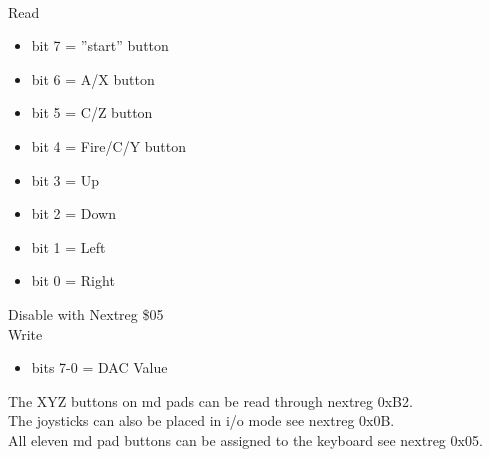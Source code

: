\\
Read
\begin{itemize}
\item[] bit 7 = ''start'' button
\item[] bit 6 = A/X button
\item[] bit 5 = C/Z button
\item[] bit 4 = Fire/C/Y button
\item[] bit 3 = Up
\item[] bit 2 = Down
\item[] bit 1 = Left
\item[] bit 0 = Right
\end{itemize}
Disable with Nextreg \$05\\
Write
\begin{itemize}
\item[] bits 7-0 = DAC Value
\end{itemize}
The XYZ buttons on md pads can be read through nextreg 0xB2.\\
The joysticks can also be placed in i/o mode see nextreg 0x0B.\\
All eleven md pad buttons can be assigned to the keyboard see nextreg 0x05.
